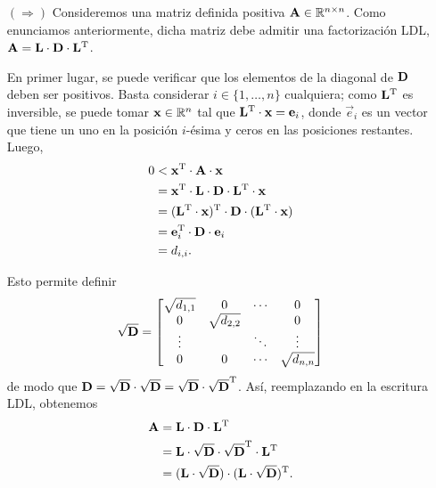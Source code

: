 \begin{itemize}
\item[$(\Rightarrow)$] Consideremos una matriz definida positiva $\mathbf{A} \in
    \mathbb{R}^{n \times n}$. Como enunciamos anteriormente, dicha matriz debe
    admitir una factorización LDL,
    $\mathbf{A} = \mathbf{L} \cdot \mathbf{D} \cdot \mathbf{L}^{\mathrm{T}}$.

    En primer lugar, se puede verificar que los elementos de la diagonal de
    $\mathbf{D}$ deben ser positivos.
    Basta considerar $i \in \{1, \dots, n\}$ cualquiera; como
    $\mathbf{L}^{\mathrm{T}}$ es inversible, se puede tomar $\mathbf{x} \in \mathbb{R}^n$ tal
    que $\mathbf{L}^{\mathrm{T}} \cdot \mathbf{x} = \mathbf{e}_i$, donde $\vec{e}_i$ es un
    vector que tiene un uno en la posición $i$-ésima y ceros en
    las posiciones restantes. Luego,
    \[ \begin{aligned}
        0 &< \mathbf{x}^{\mathrm{T}} \cdot \mathbf{A} \cdot \mathbf{x} \\
          &= \mathbf{x}^{\mathrm{T}} \cdot \mathbf{L} \cdot \mathbf{D} \cdot \mathbf{L}^{\mathrm{T}}
            \cdot \mathbf{x} \\
          &= (\mathbf{L}^{\mathrm{T}} \cdot \mathbf{x})^{\mathrm{T}} \cdot \mathbf{D} \cdot
             (\mathbf{L}^{\mathrm{T}} \cdot \mathbf{x}) \\
          &= \mathbf{e}_i^{\mathrm{T}} \cdot \mathbf{D} \cdot \mathbf{e}_i \\
          &= d_{i,i}.
    \end{aligned} \]

    Esto permite definir
    \[ \mathbf{\sqrt{D}} = \begin{bmatrix}
        \sqrt{d_{1,1}} & 0              & \cdots & 0 \\
        0              & \sqrt{d_{2,2}} &        & 0 \\
        \vdots         &                & \ddots & \vdots \\
        0              & 0              & \cdots & \sqrt{d_{n,n}}
    \end{bmatrix} \]
    de modo que $\mathbf{D} = \mathbf{\sqrt{D}} \cdot \mathbf{\sqrt{D}} =
    \mathbf{\sqrt{D}} \cdot \mathbf{\sqrt{D}}^{\mathrm{T}}$. Así, reemplazando en la
    escritura LDL, obtenemos
    \[ \begin{aligned} \mathbf{A}
        &= \mathbf{L} \cdot \mathbf{D} \cdot \mathbf{L}^{\mathrm{T}} \\
        &= \mathbf{L} \cdot \mathbf{\sqrt{D}} \cdot \mathbf{\sqrt{D}}^{\mathrm{T}}
            \cdot \mathbf{L}^{\mathrm{T}} \\
        &= (\mathbf{L} \cdot \mathbf{\sqrt{D}}) \cdot
            (\mathbf{L} \cdot \mathbf{\sqrt{D}})^{\mathrm{T}}. \\
    \end{aligned} \]


\end{itemize}
